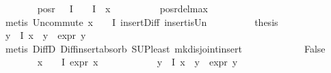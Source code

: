 \begin{isabellebody}
\ \ \ \ \ \ \isamarkupfalse%
\ {\isachardoublequoteopen}{\isacharparenleft}{\kern0pt}pos{\isacharunderscore}{\kern0pt}r\ {\isacharparenleft}{\kern0pt}{\isasymPhi}\ {\isacharbackquote}{\kern0pt}\ I{\isacharparenright}{\kern0pt}{\isacharparenright}{\kern0pt}\ {\isacharequal}{\kern0pt}\ {\isacharparenleft}{\kern0pt}{\isasymPhi}\ {\isacharbackquote}{\kern0pt}\ I{\isacharparenright}{\kern0pt}\ {\isacharminus}{\kern0pt}\ {\isacharbraceleft}{\kern0pt}x{\isacharbraceright}{\kern0pt}{\isachardoublequoteclose}\isanewline
\ \ \ \ \ \ \ \ \isamarkupfalse%
\ pos{\isacharunderscore}{\kern0pt}r{\isacharunderscore}{\kern0pt}del{\isacharunderscore}{\kern0pt}max\isanewline
\ \ \ \ \ \ \ \ \isamarkupfalse%
\ {\isacharparenleft}{\kern0pt}metis\ Un{\isacharunderscore}{\kern0pt}commute\ {\isacartoucheopen}x\ {\isasymin}\ {\isasymPhi}\ {\isacharbackquote}{\kern0pt}\ I{\isacartoucheclose}\ insert{\isacharunderscore}{\kern0pt}Diff\ insert{\isacharunderscore}{\kern0pt}is{\isacharunderscore}{\kern0pt}Un{\isacharparenright}{\kern0pt}\isanewline
\ \ \ \ \ \ \isamarkupfalse%
\ \isamarkupfalse%
\ {\isacharquery}{\kern0pt}thesis\ \isanewline
\ \ \ \ \ \ \ \ \isamarkupfalse%
\ {\isacartoucheopen}{\isasymforall}y{\isasymin}{\isasymPhi}\ {\isacharbackquote}{\kern0pt}\ I{\isachardot}{\kern0pt}\ x\ {\isasymnoteq}\ y\ {\isasymlongrightarrow}\ expr{\isacharunderscore}{\kern0pt}{}\ y\ {\isasymle}\ {}{\isacartoucheclose}\ \isanewline
\ \ \ \ \ \ \ \ \isamarkupfalse%
\ {\isacharparenleft}{\kern0pt}metis\ DiffD{}\ Diff{\isacharunderscore}{\kern0pt}insert{\isacharunderscore}{\kern0pt}absorb\ SUP{\isacharunderscore}{\kern0pt}least\ mk{\isacharunderscore}{\kern0pt}disjoint{\isacharunderscore}{\kern0pt}insert{\isacharparenright}{\kern0pt}\isanewline
\ \ \ \ \isamarkupfalse%
\isanewline
\ \ \ \ \ \ \isamarkupfalse%
\ False\isanewline
\ \ \ \ \ \ \isamarkupfalse%
\ {\isachardoublequoteopen}{\isasymforall}x\ {\isasymin}\ {\isasymPhi}\ {\isacharbackquote}{\kern0pt}\ I{\isachardot}{\kern0pt}\ expr{\isacharunderscore}{\kern0pt}{}\ x\ {\isasymle}\ {}{\isachardoublequoteclose}\isanewline
\ \ \ \ \ \ \ \ \isamarkupfalse%
\ {\isacartoucheopen}{\isasymforall}y{\isasymin}{\isasymPhi}\ {\isacharbackquote}{\kern0pt}\ I{\isachardot}{\kern0pt}\ x\ {\isasymnoteq}\ y\ {\isasymlongrightarrow}\ expr{\isacharunderscore}{\kern0pt}{}\ y\ {\isasymle}\ {}{\isacartoucheclose}\ \isanewline

\end{isabellebody}
